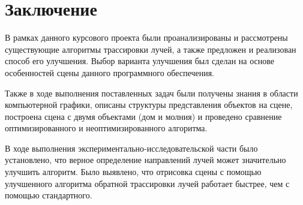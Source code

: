 \chapter*{Заключение}

В рамках данного курсового проекта были проанализированы и рассмотрены существующие алгоритмы трассировки лучей, а также предложен и реализован способ его улучшения. Выбор варианта улучшения был сделан на основе особенностей сцены данного программного обеспечения. 

Также в ходе выполнения поставленных задач были получены знания в области компьютерной графики, описаны структуры представления объектов на сцене, построена сцена с двумя объектами (дом и молния) и проведено сравнение оптимизированного и неоптимизированного алгоритма.

В ходе выполнения экспериментально-исследовательской части было установлено, что верное определение направлений лучей может значительно улучшить алгоритм. Было выявлено, что отрисовка сцены с помощью улучшенного алгоритма обратной трассировки лучей работает быстрее, чем с помощью стандартного. 

